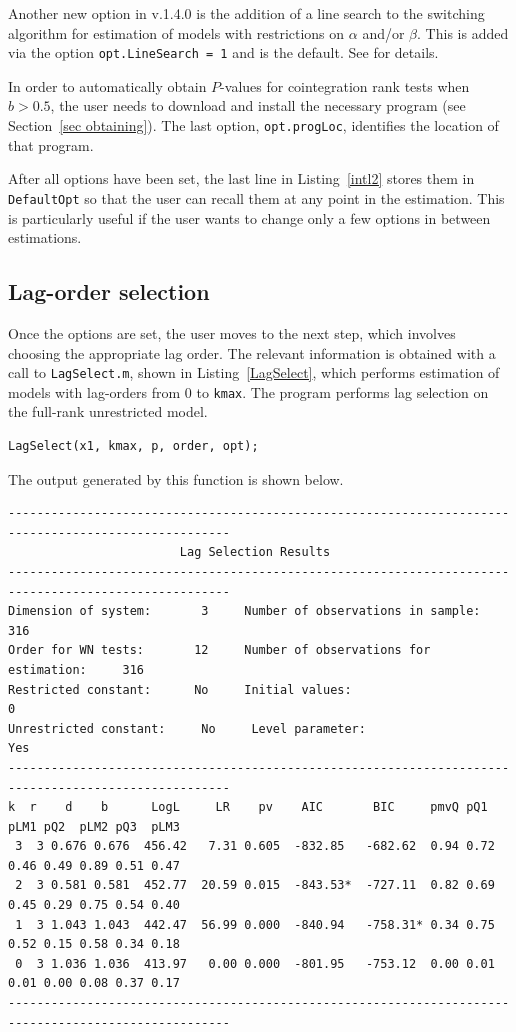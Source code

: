 \documentclass[10pt]{article}
\begin{document}
Another new option in v.1.4.0 is the addition of a line search to the switching algorithm for estimation of models with restrictions on $\alpha$ and/or $\beta$. This is added via the option \verb|opt.LineSearch = 1| and is the default. See \citet[Section 2.2]{Doornik2016} for details.

In order to automatically obtain $P$-values for cointegration rank tests when $b>0.5$, the user needs to download and install the necessary program (see Section~\ref{sec obtaining}). The last option, \verb|opt.progLoc|, identifies the location of that program.

After all options have been set, the last line in Listing~\ref{intl2} stores them in \verb|DefaultOpt| so that the user can recall them at any point in the estimation. This is particularly useful if the user wants to change only a few options in between estimations.


\subsection{Lag-order selection}

Once the options are set, the user moves to the next step, which involves choosing the appropriate lag order. The relevant information is obtained with a call to \verb|LagSelect.m|, shown in Listing~\ref{LagSelect}, which performs estimation of models with lag-orders from $0$ to \verb|kmax|. The program performs lag selection on the full-rank unrestricted model. 

\begin{lstlisting}[frame=single,caption={Lag selection}, label = LagSelect]
%% --------- LAG SELECTION ---------- %
LagSelect(x1, kmax, p, order, opt);
\end{lstlisting}

The output generated by this function is shown below. 

\begin{verbatim}
-----------------------------------------------------------------------------------------------------
                        Lag Selection Results 
-----------------------------------------------------------------------------------------------------
Dimension of system:       3     Number of observations in sample:          316 
Order for WN tests:       12     Number of observations for estimation:     316 
Restricted constant:      No     Initial values:                              0
Unrestricted constant:     No     Level parameter:                           Yes
-----------------------------------------------------------------------------------------------------
k  r    d    b      LogL     LR    pv    AIC       BIC     pmvQ pQ1  pLM1 pQ2  pLM2 pQ3  pLM3
 3  3 0.676 0.676  456.42   7.31 0.605  -832.85   -682.62  0.94 0.72 0.46 0.49 0.89 0.51 0.47
 2  3 0.581 0.581  452.77  20.59 0.015  -843.53*  -727.11  0.82 0.69 0.45 0.29 0.75 0.54 0.40
 1  3 1.043 1.043  442.47  56.99 0.000  -840.94   -758.31* 0.34 0.75 0.52 0.15 0.58 0.34 0.18
 0  3 1.036 1.036  413.97   0.00 0.000  -801.95   -753.12  0.00 0.01 0.01 0.00 0.08 0.37 0.17
-----------------------------------------------------------------------------------------------------
\end{verbatim}
\end{document}
